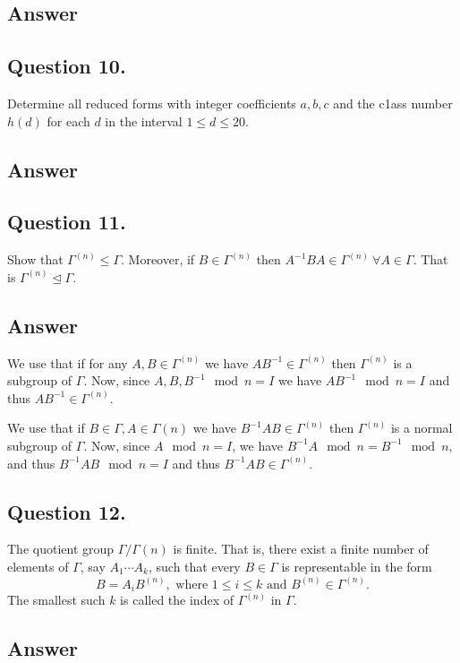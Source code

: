 \subsection*{Answer}
\noindent
[TBD]


\subsection{Question 10.}
\noindent
Determine all reduced forms with integer coefficients $a, b, c$ and the c1ass number $h(d)$ for each $d$ in the
interval $1 \leq d \leq 20$.

\subsection*{Answer}
\noindent
[TBD]


\subsection{Question 11.}
\noindent
Show that $\Gamma^{(n)} \leqslant \Gamma$. Moreover, if $B \in \Gamma^{(n)}$ then
$A^{-1} B A \in \Gamma^{(n)} \ \forall A \in \Gamma$. That is $\Gamma^{(n)} \mathrel{\unlhd} \Gamma$.

\subsection*{Answer}
\noindent
We use that if for any $A,B \in \Gamma^{(n)}$ we have $AB^{-1} \in \Gamma^{(n)}$ then $\Gamma^{(n)}$ is a subgroup
of $\Gamma$. Now, since $A,B,B^{-1} \mod n =I$ we have $AB^{-1} \mod n = I$ and thus $AB^{-1} \in \Gamma^{(n)}$.

\noindent
We use that if $B \in \Gamma, A \in \Gamma{(n)}$ we have $B^{-1}AB \in \Gamma^{(n)}$ then $\Gamma^{(n)}$ is a normal
subgroup of $\Gamma$. Now, since $A \mod n = I$, we have $B^{-1}A \mod n = B^{-1} \mod n$, and
thus $B^{-1}AB \mod n = I$ and thus $B^{-1}AB \in \Gamma^{(n)}$.


\subsection{Question 12.}
\noindent
The quotient group $\Gamma / \Gamma{(n)}$ is finite. That is, there exist a finite number of elements of
$\Gamma$, say $A_1 \cdots A_k$, such that every $B \in \Gamma$ is representable in the form
\[
    B=A_i B^{(n)}, \text{ where } 1 \leq i \leq k \text{ and } B^{(n)} \in \Gamma^{(n)}.
\]
The smallest such $k$ is called the index of $\Gamma^{(n)}$ in $\Gamma$.

\subsection*{Answer}
\noindent
[TBD]